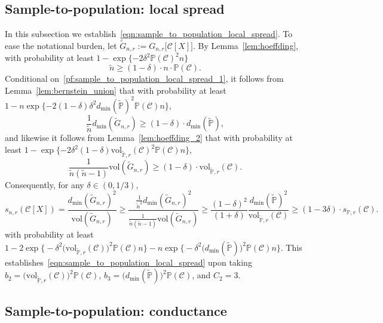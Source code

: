 \documentclass{article}
\newcommand{\vol}{\mathrm{vol}}
\newcommand{\1}{\mathbf{1}}
\newcommand{\mc}[1]{\mathcal{#1}}
\newcommand{\Pbb}{\mathbb{P}}
\newcommand{\wt}[1]{\widetilde{#1}}
\theoremstyle{definition}
\theoremstyle{remark}
\begin{document}
\subsection{Sample-to-population: local spread}
\label{subsec:sample_to_population_local_spread}
In this subsection we establish~\eqref{eqn:sample_to_population_local_spread}. To ease the notational burden, let $\wt{G}_{n,r} := G_{n,r}\bigl[\mc{C}[X]\bigr]$. By Lemma~\ref{lem:hoeffding}, with probability at least $1 - \exp\{-2\delta^2 \Pbb(\mc{C})^2n\}$
\begin{equation}
\label{pf:sample_to_population_local_spread_1}
\wt{n} \geq (1 - \delta) \cdot n \cdot \Pbb(\mc{C}).
\end{equation}
Conditional on~\eqref{pf:sample_to_population_local_spread_1}, it follows from Lemma~\ref{lem:bernstein_union} that with probability at least $1 -n\exp\{-2(1 - \delta)\delta^2d_{\min}(\wt{\Pbb})^2 \Pbb(\mc{C}) n\}$,
\begin{equation}
\label{pf:sample_to_population_local_spread_2}
\frac{1}{\wt{n}} d_{\min}(\wt{G}_{n,r}) \geq (1 - \delta) \cdot d_{\min}(\wt{\Pbb}),
\end{equation}
and likewise it follows from Lemma~\ref{lem:hoeffding_2} that with probability at least $1 - \exp\{-2\delta^2(1 - \delta) \vol_{\wt{\Pbb},r}(\mc{C})^2 \Pbb(\mc{C})n \}$,
\begin{equation*}
\frac{1}{\wt{n}(\wt{n} - 1)} \vol(\wt{G}_{n,r}) \geq (1 - \delta) \cdot \vol_{\wt{\Pbb},r}(\mc{C}).
\end{equation*}
Consequently, for any $\delta \in (0,1/3)$,
\begin{equation*}
s_{n,r}(\mc{C}[X]) = \frac{d_{\min}(\wt{G}_{n,r})^2}{\vol(\wt{G}_{n,r})} \geq \frac{\frac{1}{\wt{n}^2}d_{\min}(\wt{G}_{n,r})^2}{\frac{1}{\wt{n}(\wt{n} - 1)}\vol(\wt{G}_{n,r})} \geq \frac{(1 - \delta)^2}{(1 + \delta)} \frac{d_{\min}(\wt{\Pbb})^2}{\vol_{\wt{\Pbb},r}(\mc{C})} \geq (1 - 3\delta) \cdot s_{\Pbb,r}(\mc{C}).
\end{equation*}
with probability at least $1 - 2\exp\bigl\{-\delta^2\bigl(\vol_{\wt{\Pbb},r}(\mc{C})\bigr)^2 \Pbb(\mc{C})n\bigr\} - n\exp\bigl\{-\delta^2\bigl(d_{\min}(\wt{\Pbb})\bigr)^2 \Pbb(\mc{C}) n\bigr\}$. This establishes~\eqref{eqn:sample_to_population_local_spread} upon taking $b_2 = \bigl(\vol_{\wt{\Pbb},r}(\mc{C})\bigr)^2 \Pbb(\mc{C})$, $b_3 = \bigl(d_{\min}(\wt{\Pbb})\bigr)^2 \Pbb(\mc{C})$, and $C_2 = 3$. 

\subsection{Sample-to-population: conductance}
\label{subsec:sample_to_population_conductance}
\end{document}
